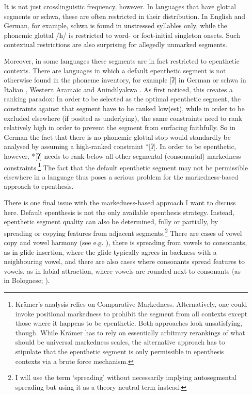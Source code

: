 \documentclass[output=paper,colorlinks,citecolor=brown]{langscibook}
\begin{document}
It is not just crosslinguistic frequency, however. In languages that have glottal segments or schwa, these are often restricted in their distribution. In English and German, for example, schwa is found in unstressed syllables only, while the phonemic glottal /h/ is restricted to word- or foot-initial singleton onsets. Such contextual restrictions are also surprising for allegedly unmarked segments.

Moreover, in some languages these segments are in fact  restricted to epenthetic contexts. There are languages in which a default epenthetic segment is not otherwise found in the phoneme inventory, for example [ʔ] in German \citep{alber01, wiese98} or schwa in Italian \citep{repetti12}, Western Aramaic \citep{eid21} and Anindilyakwa . As \citet{kramer06} first noticed, this creates a ranking paradox: In order to be selected as the optimal epenthetic segment, the constraints against that segment have to be ranked low(est), while in order to be excluded elsewhere (if posited as underlying), the same constraints need to rank relatively high in order to prevent the segment from surfacing faithfully. So in German the fact that there is no phonemic glottal stop would standardly be analysed by assuming a high-ranked constraint *[ʔ]. In order to be epenthetic, however, *[ʔ] needs to rank below all other segmental (consonantal) markedness constraints.\footnote{Krämer's analysis relies on Comparative Markedness. Alternatively, one could invoke positional markedness to prohibit the segment from all contexts except those where it happens to be epenthetic. Both approaches look unsatisfying, though. While Krämer has to rely on essentially arbitrary rerankings of what should be universal markedness scales, the alternative approach has to stipulate that the epenthetic segment is only permissible in epenthesis contexts via  a brute force mechanism.} The fact that the default epenthetic segment may not be permissible elsewhere in a language thus poses a serious problem for the markedness-based approach to epenthesis.

There is one final issue with the markedness-based approach I want to discuss here. Default epenthesis is not the only available epenthesis strategy. Instead, epenthetic segment quality 
can also be determined, fully or partially, by spreading or copying features from adjacent segments.\footnote{I will use the term `spreading' without necessarily implying autosegmental spreading but using it as a theory-neutral term instead.} There are cases of vowel copy and vowel harmony (see e.g. \citealt{stantonzukoff}), there is spreading from vowels to consonants, as in glide insertion, where the glide typically agrees in backness with a neighbouring vowel, and there are also cases where consonants spread features to vowels, as in labial attraction, where vowels are rounded next to consonants (as in Bolognese; ).
\end{document}
